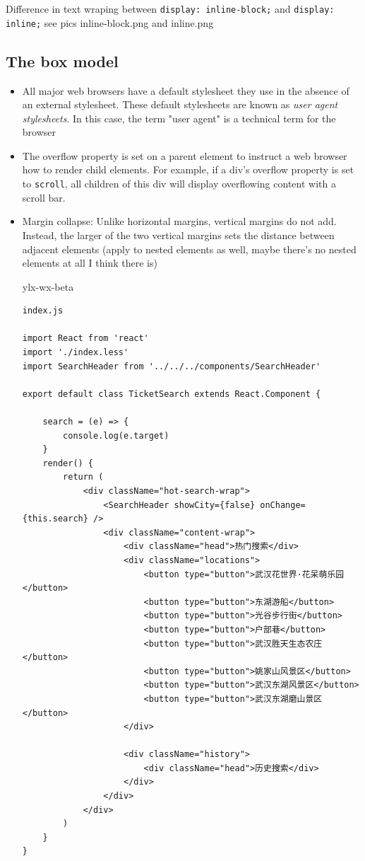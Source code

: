 \documentclass[a4paper, 12pt]{article}
\begin{document}
Difference in text wraping between \verb|display: inline-block;| and \verb|display: inline;| see pics inline-block.png and inline.png

\subsection{The box model}
\begin{itemize}

\item All major web browsers have a default stylesheet they use in the absence of an external stylesheet. These default stylesheets are known as \textit{user agent stylesheets}. In this case, the term "user agent" is a technical term for the browser

\item The overflow property is set on a parent element to instruct a web browser how to render child elements. For example, if a div's overflow property is set to \verb|scroll|, all children of this div will display overflowing content with a scroll bar.

\item Margin collapse: Unlike horizontal margins, vertical margins do not add. Instead, the larger of the two vertical margins sets the distance between adjacent elements (apply to nested elements as well, maybe there's no nested elements at all {\color{red} I think there is})

ylx-wx-beta
\begin{verbatim}
index.js

import React from 'react'
import './index.less'
import SearchHeader from '../../../components/SearchHeader'

export default class TicketSearch extends React.Component {

	search = (e) => {
		console.log(e.target)
	}
	render() {
		return (
			<div className="hot-search-wrap">
				<SearchHeader showCity={false} onChange={this.search} />
				<div className="content-wrap">
					<div className="head">热门搜索</div>
					<div className="locations">
						<button type="button">武汉花世界·花呆萌乐园</button>
						<button type="button">东湖游船</button>
						<button type="button">光谷步行街</button>
						<button type="button">户部巷</button>
						<button type="button">武汉胜天生态农庄</button>
						<button type="button">姚家山风景区</button>
						<button type="button">武汉东湖风景区</button>
						<button type="button">武汉东湖磨山景区</button>
					</div>

					<div className="history">
						<div className="head">历史搜索</div>
					</div>
				</div>
			</div>
		)
	}
}



\end{verbatim}
\end{itemize}
\end{document}
